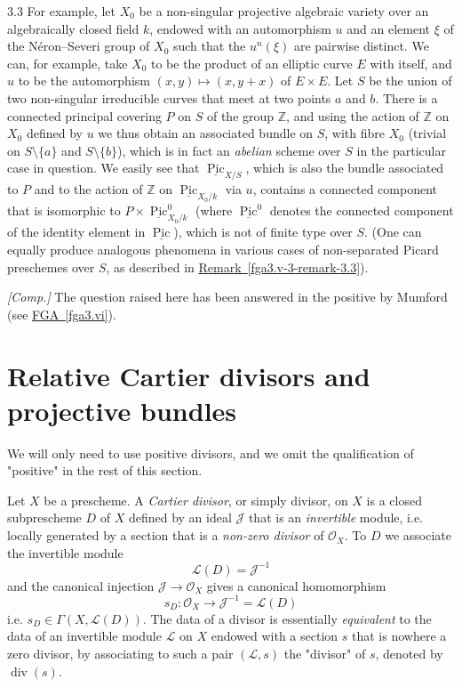\begin{remark}{3.3}
    For example, let \(X_0\) be a non-singular projective algebraic variety over an algebraically closed field \(k\), endowed with an automorphism \(u\) and an element \(\xi \) of the Néron–Severi group of \(X_0\) such that the \(u^n(\xi )\) are pairwise distinct.
    We can, for example, take \(X_0\) to be the product of an elliptic curve \(E\) with itself, and \(u\) to be the automorphism \((x,y)\mapsto (x,y+x)\) of \(E\times  E\).
    Let \(S\) be the union of two non-singular irreducible curves that meet at two points \(a\) and \(b\).
    There is a connected principal covering \(P\) on \(S\) of the group \(\mathbb {Z}\), and using the action of \(\mathbb {Z}\) on \(X_0\) defined by \(u\) we thus obtain an associated bundle on \(S\), with fibre \(X_0\) (trivial on \(S\setminus \{a\}\) and \(S\setminus \{b\}\)), which is in fact an \emph{abelian} scheme over \(S\) in the particular case in question.
    We easily see that \(\underline {\operatorname {Pic}}_{X/S}\), which is also the bundle associated to \(P\) and to the action of \(\mathbb {Z}\) on \(\underline {\operatorname {Pic}}_{X_0/k}\) via \(u\), contains a connected component that is isomorphic to \(P\times \underline {\operatorname {Pic}}_{X_0/k}^0\) (where \(\underline {\operatorname {Pic}}^0\) denotes the connected component of the identity element in \(\underline {\operatorname {Pic}}\)), which is not of finite type over \(S\).
    (One can equally produce analogous phenomena in various cases of non-separated Picard preschemes over \(S\), as described in \hyperref[fga3.v-3-remark-3.3]{Remark~\ref*{fga3.v-3-remark-3.3}}).

    \emph{[Comp.]}
    The question raised here has been answered in the positive by Mumford (see \hyperref[fga3.vi]{FGA~\ref*{fga3.vi}}).\end{remark}\chapter{Relative Cartier divisors and projective bundles}\thispagestyle{fancy}\label{fga3.v-4}\par{}We will only need to use positive divisors, and we omit the qualification of "positive" in the rest of this section.\par{}Let \(X\) be a prescheme.
  A \emph{Cartier divisor}, or simply divisor, on \(X\) is a closed subprescheme \(D\) of \(X\) defined by an ideal \(\mathscr {J}\) that is an \emph{invertible} module, i.e. locally generated by a section that is a \emph{non-zero divisor} of \(\mathcal {O}_X\).
  To \(D\) we associate the invertible module
  \[     \mathscr {L}(D)     = \mathscr {J}^{-1}   \]
  and the canonical injection \(\mathscr {J}\to \mathcal {O}_X\) gives a canonical homomorphism
  \[     s_D\colon  \mathcal {O}_X     \to  \mathscr {J}^{-1}     = \mathscr {L}(D)   \]
  i.e. \(s_D\in \Gamma (X,\mathscr {L}(D))\).
  The data of a divisor is essentially \emph{equivalent} to the data of an invertible module \(\mathscr {L}\) on \(X\) endowed with a section \(s\) that is nowhere a zero divisor, by associating to such a pair \((\mathscr {L},s)\) the "divisor" of \(s\), denoted by \(\operatorname {div}(s)\).
  

